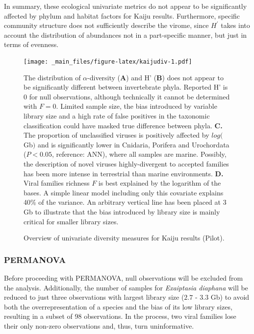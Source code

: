 \documentclass[
  openany]{book}
\begin{document}
In summary, these ecological univariate metrics do not appear to be significantly affected by phylum and habitat factors for Kaiju results. Furthermore, specific community structure does not sufficiently describe the virome, since \(H^\prime\) takes into account the distribution of abundances not in a part-specific manner, but just in terms of evenness.

\begin{figure}[!htbp]

\texttt{[image: \_main\_files/figure-latex/kaijudiv-1.pdf]}

\caption{Overview of univariate diversity measures for Kaiju results (Pilot). \label{fig:kaijudiv}}
The distribution of $\alpha$-diversity (\textbf{A}) and H' (\textbf{B}) does not appear to be significantly different between invertebrate phyla. Reported H' is 0 for null observations, although technically it cannot be determined with $F=0$. Limited sample size, the bias introduced by variable library size and a high rate of false positives in the taxonomic classification could have masked true difference between phyla. \textbf{C.} The proportion of unclassified viruses is positively affected by $log($Gb$)$ and is significantly lower in Cnidaria, Porifera and Urochordata ($P < 0.05$, reference: ANN), where all samples are marine. Possibly, the description of novel viruses highly-divergent to accepted families has been more intense in terrestrial than marine environments. \textbf{D.} Viral families richness $F$ is best explained by the logarithm of the bases. A simple linear model including only this covariate explains 40\% of the variance. An arbitrary vertical line has been placed at $3$ Gb to illustrate that the bias introduced by library size is mainly critical for smaller library sizes.

\end{figure}

\hypertarget{permanova-1}{%
\subsubsection{PERMANOVA}\label{permanova-1}}

Before proceeding with PERMANOVA, null observations will be excluded from the analysis. Additionally, the number of samples for \emph{Exaiptasia diaphana} will be reduced to just three observations with largest library size (\(2.7\) - \(3.3\) Gb) to avoid both the overrepresentation of a species and the bias of its low library sizes, resulting in a subset of 98 observations. In the process, two viral families lose their only non-zero observations and, thus, turn uninformative.
\end{document}
